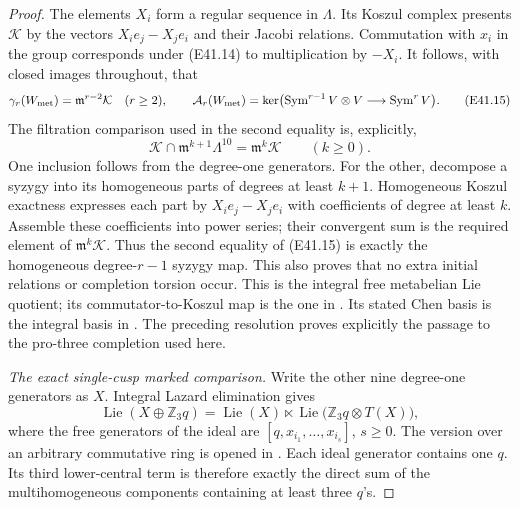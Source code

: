 \begin{proof}
The elements $X_i$ form a regular sequence in
$\Lambda$. Its Koszul complex presents $\mathcal K$
by the vectors $X_ie_j-X_je_i$ and their Jacobi
relations. Commutation with $x_i$ in the group
corresponds under (E41.14) to multiplication by
$-X_i$. It follows, with closed images throughout,
that
\[
 \gamma_r(W_{\rm met})=\mathfrak m^{r-2}\mathcal K
 \quad(r\ge2),\qquad
 \mathcal A_r(W_{\rm met})
  =\ker\bigl(\operatorname{Sym}^{r-1}V\otimes V
                        \longrightarrow\operatorname{Sym}^rV\bigr).
 \tag{E41.15}
\]
The filtration comparison used in the second
equality is, explicitly,
\[
 \mathcal K\cap\mathfrak m^{k+1}\Lambda^{10}
                   =\mathfrak m^k\mathcal K\qquad(k\ge0).
\]
One inclusion follows from the degree-one
generators. For the other, decompose a syzygy
into its homogeneous parts of degrees at least
$k+1$. Homogeneous Koszul exactness expresses
each part by $X_ie_j-X_je_i$ with coefficients
of degree at least $k$. Assemble these
coefficients into power series; their convergent
sum is the required element of
$\mathfrak m^k\mathcal K$. Thus the second
equality of (E41.15) is exactly the homogeneous
degree-$r-1$ syzygy map. This also proves that
no extra initial relations or completion
torsion occur.
This is the integral free metabelian Lie quotient;
its commutator-to-Koszul map is the one in
\cite[Theorem 6.2, including (6.3)--(6.4)]{E_PapadimaSuciuChen}.
Its stated Chen basis is the integral basis in
\cite[\S2.4, equation(2), p.~5]{E_SatohChen}.
The preceding resolution proves explicitly the
passage to the pro-three completion used here.

\emph{The exact single-cusp marked comparison.}
Write the other nine degree-one generators as $X$.
Integral Lazard elimination gives
\[
 \operatorname{Lie}(X\oplus\mathbb Z_3q)
       =\operatorname{Lie}(X)\ltimes
          \operatorname{Lie}\bigl(\mathbb Z_3q\otimes T(X)\bigr),
 \tag{E41.16}
\]
where the free generators of the ideal are
$[q,x_{i_1},\ldots,x_{i_s}]$, $s\ge0$.
The version over an arbitrary commutative ring is
opened in \cite[\S2, Lazard Elimination Theorem,
p.~3]{E_StohrLazard}. Each ideal generator contains
one $q$. Its third lower-central term is therefore
exactly the direct sum of the multihomogeneous
components containing at least three $q$'s.


\end{proof}
